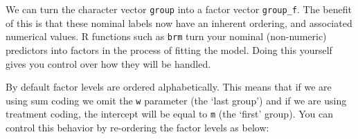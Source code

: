 \documentclass[
]{book}
\newenvironment{Shaded}{\begin{snugshade}}{\end{snugshade}}
\newcommand{\CommentTok}[1]{\textcolor[rgb]{0.56,0.35,0.01}{\textit{#1}}}
\newcommand{\DocumentationTok}[1]{\textcolor[rgb]{0.56,0.35,0.01}{\textbf{\textit{#1}}}}
\newcommand{\FunctionTok}[1]{\textcolor[rgb]{0.00,0.00,0.00}{#1}}
\newcommand{\NormalTok}[1]{#1}
\newcommand{\OtherTok}[1]{\textcolor[rgb]{0.56,0.35,0.01}{#1}}
\newcommand{\SpecialCharTok}[1]{\textcolor[rgb]{0.00,0.00,0.00}{#1}}
\begin{document}
\begin{Shaded}
\end{Shaded}

We can turn the character vector \texttt{group} into a factor vector \texttt{group\_f}. The benefit of this is that these nominal labels now have an inherent ordering, and associated numerical values. R functions such as \texttt{brm} turn your nominal (non-numeric) predictors into factors in the process of fitting the model. Doing this yourself gives you control over how they will be handled.

\begin{Shaded}
\end{Shaded}

By default factor levels are ordered alphabetically. This means that if we are using sum coding we omit the \texttt{w} parameter (the `last group') and if we are using treatment coding, the intercept will be equal to \texttt{m} (the `first' group). You can control this behavior by re-ordering the factor levels as below:
\end{document}
